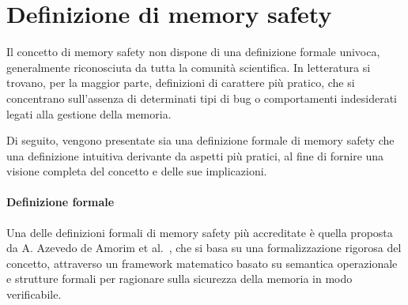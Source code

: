 \section{Definizione di memory safety}
\label{sec:memory_safety}

Il concetto di memory safety non dispone di una definizione formale univoca,
generalmente riconosciuta da tutta la comunità scientifica. In letteratura si trovano,
per la maggior parte, definizioni di carattere più pratico, che si concentrano
sull'assenza di determinati tipi di bug o comportamenti indesiderati legati alla
gestione della memoria.

Di seguito, vengono presentate sia una definizione formale di memory safety che una
definizione intuitiva derivante da aspetti più pratici, al fine di fornire una
visione completa del concetto e delle sue implicazioni.

\paragraph{Definizione formale}

Una delle definizioni formali di memory safety più accreditate è quella proposta
da A. Azevedo de Amorim et al.~\cite{meaning_memory_safety}, che si basa su una
formalizzazione rigorosa del concetto, attraverso un framework matematico basato
su semantica operazionale e strutture formali per ragionare sulla sicurezza della
memoria in modo verificabile.

